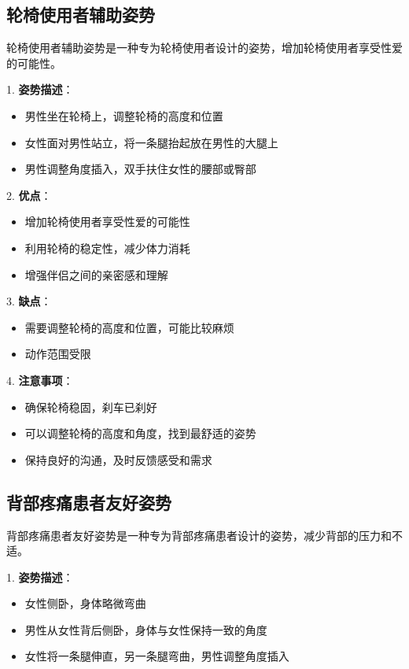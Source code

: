 \documentclass[12pt,UTF8]{ctexbook}
\begin{document}
\subsection{轮椅使用者辅助姿势}

轮椅使用者辅助姿势是一种专为轮椅使用者设计的姿势，增加轮椅使用者享受性爱的可能性。

1. \textbf{姿势描述}：
  \begin{itemize}
  \item 男性坐在轮椅上，调整轮椅的高度和位置
  \item 女性面对男性站立，将一条腿抬起放在男性的大腿上
  \item 男性调整角度插入，双手扶住女性的腰部或臀部
  \end{itemize}

2. \textbf{优点}：
  \begin{itemize}
  \item 增加轮椅使用者享受性爱的可能性
  \item 利用轮椅的稳定性，减少体力消耗
  \item 增强伴侣之间的亲密感和理解
  \end{itemize}

3. \textbf{缺点}：
  \begin{itemize}
  \item 需要调整轮椅的高度和位置，可能比较麻烦
  \item 动作范围受限
  \end{itemize}

4. \textbf{注意事项}：
  \begin{itemize}
  \item 确保轮椅稳固，刹车已刹好
  \item 可以调整轮椅的高度和角度，找到最舒适的姿势
  \item 保持良好的沟通，及时反馈感受和需求
  \end{itemize}

\subsection{背部疼痛患者友好姿势}

背部疼痛患者友好姿势是一种专为背部疼痛患者设计的姿势，减少背部的压力和不适。

1. \textbf{姿势描述}：
  \begin{itemize}
  \item 女性侧卧，身体略微弯曲
  \item 男性从女性背后侧卧，身体与女性保持一致的角度
  \item 女性将一条腿伸直，另一条腿弯曲，男性调整角度插入
  \end{itemize}
\end{document}
